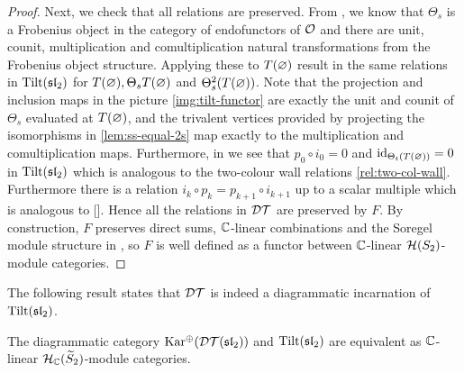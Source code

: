 \begin{proof}
    Next, we check that all relations are preserved. From \cite[Proposition 5.84 and Lemma 5.87]{mazorchuk-lectures-sl2-modules} , we know that $\Theta_s$ is a Frobenius object in the category of endofunctors of $\mathcal{O}$ and there are unit, counit, multiplication and comultiplication natural transformations from the Frobenius object structure. Applying these to $T(\varnothing)$ result in the same relations in $\operatorname{Tilt}(\operatorname{\mathfrak{sl}}_2)$ for $T(\varnothing), \Theta_s T(\varnothing)$ and $\Theta_s^2(T(\varnothing))$. Note that the projection and inclusion maps in the picture \eqref{img:tilt-functor} are exactly the unit and counit of $\Theta_s$ evaluated at $T(\varnothing)$, and the trivalent vertices provided by projecting the isomorphisms in \autoref{lem:ss-equal-2s} map exactly to the multiplication and comultiplication maps. Furthermore, in \cite[Section 2.4]{soergel-category-O}  we see that $p_0 \circ i_0 = 0$ and  $\operatorname{id}_{\Theta_t(T(\varnothing))} = 0$ in $\operatorname{Tilt}(\operatorname{\mathfrak{sl}}_2)$ which is analogous to the two-colour wall relations \eqref{rel:two-col-wall}. Furthermore there is a relation $i_k \circ p_k = p_{k+1} \circ i_{k+1}$ up to a scalar multiple  which is analogous to [].  Hence all the relations in $\mathcal{DT}$ are preserved by $F$. By construction, $F$ preserves direct sums, $\mathbb{C}$-linear combinations and the Soregel module structure in \cite{soergel-category-O}, so $F$ is well defined as a functor between $\mathbb{C}$-linear $\mathcal{H}(S_2)$-module categories.

\end{proof}


The following result states that $\mathcal{DT}$ is indeed a diagrammatic incarnation of $\operatorname{Tilt}(\operatorname{\mathfrak{sl}}_2)$.




\begin{theorem}[\red{???}]
    The diagrammatic category $\operatorname{Kar^\oplus}(\mathcal{DT}(\operatorname{\mathfrak{sl}}_2))$ and $\operatorname{Tilt}(\operatorname{\mathfrak{sl}}_2)$ are equivalent as $\mathbb{C}$-linear $\mathcal{H}_{\mathbb{C}}(\widetilde{S}_2)$-module categories.
\end{theorem}

